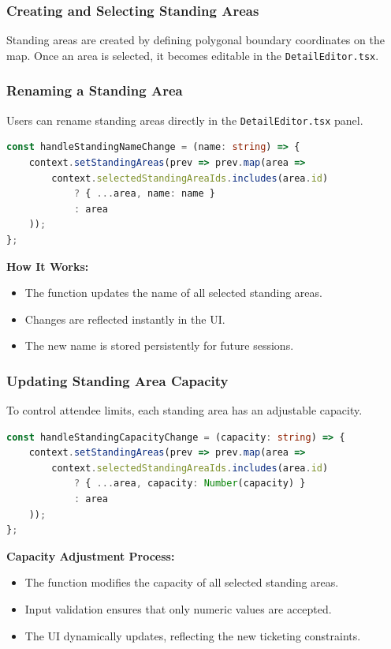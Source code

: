 \subsubsection{Creating and Selecting Standing Areas}
Standing areas are created by defining polygonal boundary coordinates on the map. Once an area is selected, it becomes editable in the \texttt{DetailEditor.tsx}.

\subsubsection{Renaming a Standing Area}
Users can rename standing areas directly in the \texttt{DetailEditor.tsx} panel.

\begin{lstlisting}[language=TypeScript, caption=Renaming Standing Areas, label=lst:rename-standingarea]
const handleStandingNameChange = (name: string) => {
    context.setStandingAreas(prev => prev.map(area =>
        context.selectedStandingAreaIds.includes(area.id)
            ? { ...area, name: name }
            : area
    ));
};
\end{lstlisting}

\textbf{How It Works:}
\begin{itemize}
    \item The function updates the name of all selected standing areas.
    \item Changes are reflected instantly in the UI.
    \item The new name is stored persistently for future sessions.
\end{itemize}

\subsubsection{Updating Standing Area Capacity}
To control attendee limits, each standing area has an adjustable capacity.

\begin{lstlisting}[language=TypeScript, caption=Updating Standing Area Capacity, label=lst:update-standingarea-capacity]
const handleStandingCapacityChange = (capacity: string) => {
    context.setStandingAreas(prev => prev.map(area =>
        context.selectedStandingAreaIds.includes(area.id)
            ? { ...area, capacity: Number(capacity) }
            : area
    ));
};
\end{lstlisting}

\textbf{Capacity Adjustment Process:}
\begin{itemize}
    \item The function modifies the capacity of all selected standing areas.
    \item Input validation ensures that only numeric values are accepted.
    \item The UI dynamically updates, reflecting the new ticketing constraints.
\end{itemize}

